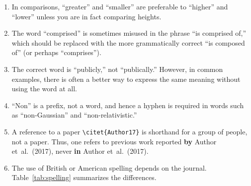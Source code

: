 \documentclass[letterpaper,11pt]{article}
\begin{document}
\begin{enumerate}
\item
In comparisons, ``greater'' and ``smaller'' are preferable to ``higher'' and ``lower'' unless you are
in fact comparing heights.

\item
The word ``comprised'' is sometimes misused in the phrase ``is comprised of,''
which should be replaced with the more grammatically correct
``is composed of'' (or perhaps ``comprises'').

\item
The correct word is ``publicly,'' not ``publically.''  However, in common
examples, there is often a better way to express the same meaning without
using the word at all.

\item
``Non'' is a prefix, not a word, and hence a hyphen is required in words such
as ``non-Gaussian'' and ``non-relativistic.''

\item
A reference to a paper \verb|\citet{Author17}| is shorthand for a group of people, not a paper.  Thus, one refers to previous work reported {\bf by} Author et~al.\ (2017), never {\bf in} Author et~al.\ (2017).

\item
The use of British or American spelling depends on the journal.  Table~\ref{tab:spelling} summarizes the differences.

\end{enumerate}
\end{document}
